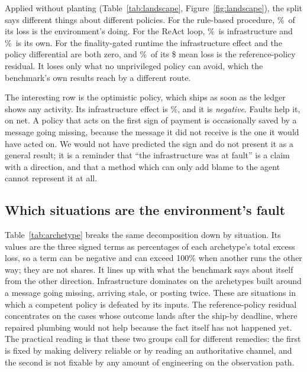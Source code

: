 \documentclass[conference]{IEEEtran}
\begin{document}
Applied without planting (Table~\ref{tab:landscape},
Figure~\ref{fig:landscape}), the split says different things about different
policies. For the rule-based procedure, \%\ of its loss is the
environment's doing. For the ReAct loop, \reactInfra\%\ is infrastructure and
\reactPolicy\%\ is its own. For the finality-gated runtime the infrastructure effect and the policy
differential are both zero, and \gateIrreducible\%\ of its \$\gateMeanLoss{}
mean loss is the reference-policy residual. It loses only what no
unprivileged policy can avoid, which the benchmark's own results reach by a
different route.

The interesting row is the optimistic policy, which ships as soon as the ledger
shows any activity. Its infrastructure effect is \optInfra\%, and it is \emph{negative}.
Faults help it, on net. A policy that acts on the first sign of payment is
occasionally saved by a message going missing, because the message it did not
receive is the one it would have acted on. We would not have predicted the sign
and do not present it as a general result; it is a reminder that ``the
infrastructure was at fault'' is a claim with a direction, and that a method
which can only add blame to the agent cannot represent it at all.

\subsection{Which situations are the environment's fault}

\begin{table}[t]
\centering
\caption{Where responsibility sits, by archetype, pooled over the three non-
gated policies.}
\label{tab:archetype}
\footnotesize\setlength{\tabcolsep}{3pt}

\end{table}

Table~\ref{tab:archetype} breaks the same decomposition down by situation. Its
values are the three signed terms as percentages of each archetype's total
excess loss, so a term can be negative and can exceed 100\% when another runs
the other way; they are not shares. It lines up with what the benchmark says
about itself from the other direction.
Infrastructure dominates on the archetypes built around a message going missing,
arriving stale, or posting twice. These are situations in which a competent
policy is defeated by its inputs. The reference-policy residual concentrates on the
cases whose outcome lands after the ship-by deadline, where repaired plumbing
would not help because the fact itself has not happened yet. The practical
reading is that these two groups call for different remedies: the first is
fixed by making delivery reliable or by reading an authoritative channel, and
the second is not fixable by any amount of engineering on the observation path.
\end{document}
